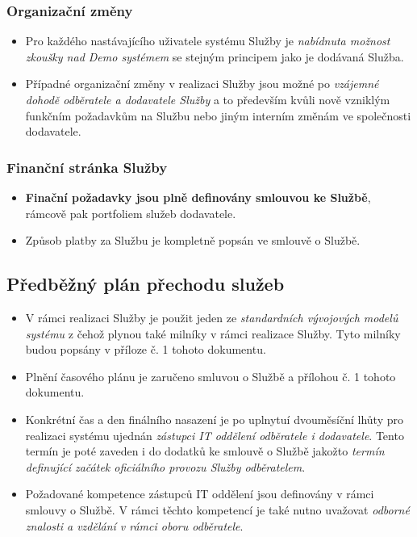 \documentclass[11pt, a4paper, titlepage]{article}
\begin{document}
	\subsubsection*{Organizační změny}

	\begin{itemize}
		\item Pro každého nastávajícího uživatele systému Služby je \emph{nabídnuta možnost zkoušky nad Demo systémem} se stejným principem jako je dodávaná Služba.
		\item Případné organizační změny v realizaci Služby jsou možné po \emph{vzájemné dohodě odběratele a dodavatele Služby} a to především kvůli nově vzniklým funkčním požadavkům na Službu nebo jiným interním změnám ve společnosti dodavatele.
	\end{itemize}

	\subsubsection*{Finanční stránka Služby}

	\begin{itemize}
		\item \textbf{Finační požadavky jsou plně definovány smlouvou ke Službě}, rámcově pak portfoliem služeb dodavatele.
		\item Způsob platby za Službu je kompletně popsán ve smlouvě o Službě.
	\end{itemize}

	\subsection*{Předběžný plán přechodu služeb}

	\begin{itemize}
		\item V rámci realizaci Služby je použit jeden ze \emph{standardních vývojových modelů systému} z čehož plynou také milníky v rámci realizace Služby. Tyto milníky budou popsány v příloze č. 1 tohoto dokumentu. 
		\item Plnění časového plánu je zaručeno smluvou o Službě a přílohou č. 1 tohoto dokumentu.
		\item Konkrétní čas a den finálního nasazení je po uplnytuí dvouměsíční lhůty pro realizaci systému ujednán \emph{zástupci IT oddělení odběratele i dodavatele}. Tento termín je poté zaveden i do dodatků ke smlouvě o Službě jakožto \emph{termín definující začátek oficiálního provozu Služby odběratelem}.
		\item Požadované kompetence zástupců IT oddělení jsou definovány v rámci smlouvy o Službě. V rámci těchto kompetencí je také nutno uvažovat \emph{odborné znalosti a vzdělání v rámci oboru odběratele}. 
	\end{itemize}
\end{document}
